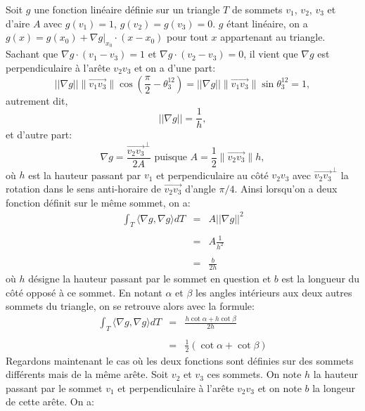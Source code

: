 Soit $g$ une fonction linéaire définie sur un triangle $T$ de sommets $v_1$, $v_2$, $v_3$ et d'aire $A$ avec \(g(v_1) = 1\), \(g(v_2) = g(v_3) = 0\). $g$ étant linéaire, on a \(g(x) = g(x_0) + \nabla g |_{x_0} \cdot (x - x_0)\) pour tout $x$ appartenant au triangle.
Sachant que \(\nabla g \cdot (v_1 - v_3) = 1\) et \(\nabla g \cdot (v_2 - v_3) = 0\), il vient que \(\nabla g\) est perpendiculaire à l'arête \(v_2v_3\) et on a d'une part:
\[
||\nabla g|| \|\overrightarrow{v_1v_3}\| \cos\left(\displaystyle\frac{\pi}{2} - \theta_3^{12}\right) = ||\nabla g|| \|\overrightarrow{v_1v_3}\| \sin \theta_3^{12}=1,
\]
autrement dit,
\[
||\nabla g||=\frac{1}{h},
\]
et d'autre part:
\[\nabla g= \displaystyle\frac{\overrightarrow{v_2v_3}^\perp}{2A}\mbox{ puisque } A=\displaystyle\frac{1}{2} \|\overrightarrow{v_2v_3}\|h,
\]
où $h$ est la hauteur passant par $v_1$ et perpendiculaire au côté $v_2v_3$ avec \(\overrightarrow{v_2v_3}^\perp\) la rotation dans le sens anti-horaire de \(\overrightarrow{v_2v_3}\) d'angle \(\pi/4\). Ainsi lorsqu'on a deux fonction définit sur le même sommet, on a:
\[
\begin{array}{lcl}
\displaystyle\int_T \langle \nabla g, \nabla g \rangle dT &= &A||\nabla g||^2\\\\
&=& A\displaystyle\frac{1}{h^2} \\\\
&=& \displaystyle\frac{b}{2h}
\end{array}
\]
où $h$ désigne la hauteur passant par le sommet en question et $b$ est la longueur du côté opposé à ce sommet. En notant $\alpha$ et $\beta$ les angles intérieurs aux deux autres sommets du triangle, on se retrouve alors avec la formule:
\[
\begin{array}{lcl}
\displaystyle\int_T \langle \nabla g, \nabla g \rangle dT  &=& \displaystyle\frac{h \cot \alpha + h \cot \beta}{2h}\\\\
&=& \displaystyle\frac{1}{2} (\cot \alpha + \cot \beta)
\end{array}
\]
Regardons maintenant le cas où les deux fonctions sont définies sur des sommets différents mais de la même arête. Soit $v_2$ et $v_3$ ces sommets. On note $h$ la hauteur passant par le sommet $v_1$ et perpendiculaire à l'arête $v_2v_3$ et on note $b$ la longeur de cette arête. On a:
